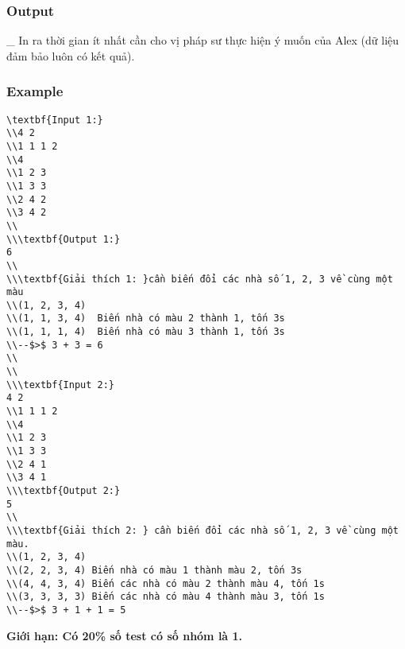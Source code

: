 \subsubsection{   Output  }

   \_ In ra thời gian ít nhất cần cho vị pháp sư thực hiện ý muốn của Alex (dữ liệu đảm bảo luôn có kết quả).  



\subsubsection{   Example  }
\begin{verbatim}
\textbf{Input 1:}
\\4 2 
\\1 1 1 2
\\4
\\1 2 3
\\1 3 3
\\2 4 2
\\3 4 2
\\
\\\textbf{Output 1:}
6
\\
\\\textbf{Giải thích 1: }cần biến đổi các nhà số 1, 2, 3 về cùng một màu
\\(1, 2, 3, 4)
\\(1, 1, 3, 4)  Biến nhà có màu 2 thành 1, tốn 3s
\\(1, 1, 1, 4)  Biến nhà có màu 3 thành 1, tốn 3s
\\--$>$ 3 + 3 = 6
\\
\\
\\\textbf{Input 2:}
4 2 
\\1 1 1 2
\\4
\\1 2 3
\\1 3 3
\\2 4 1
\\3 4 1
\\\textbf{Output 2:}
5 
\\
\\\textbf{Giải thích 2: } cần biến đổi các nhà số 1, 2, 3 về cùng một màu.
\\(1, 2, 3, 4)
\\(2, 2, 3, 4) Biến nhà có màu 1 thành màu 2, tốn 3s
\\(4, 4, 3, 4) Biến các nhà có màu 2 thành màu 4, tốn 1s
\\(3, 3, 3, 3) Biến các nhà có màu 4 thành màu 3, tốn 1s
\\--$>$ 3 + 1 + 1 = 5\end{verbatim}

\textbf{      Giới hạn:\textbf{}     Có 20\% số test có số nhóm là 1.    }
